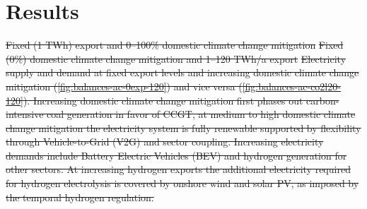 \documentclass[5p,numafflabel]{elsarticle}
\def\runstandard{decr_13_3H_ws} %
\providecommand{\DIFdeltex}[1]{{\protect\color{red}\sout{#1}}}                      %
\providecommand{\DIFdelbegin}{} %
\providecommand{\DIFdelFL}[1]{\DIFdel{#1}} %
\providecommand{\DIFdel}[1]{\texorpdfstring{\DIFdeltex{#1}}{}} %
\newcommand{\DIFscaledelfig}{0.5}
\newlength{\DIFdelgraphicswidth} %
\newlength{\DIFdelgraphicsheight} %
\newcommand{\DIFdelincludegraphics}[2][]{%
\sbox{\DIFdelgraphicsbox}{\DIFOincludegraphics[#1]{#2}}%
\settoboxwidth{\DIFdelgraphicswidth}{\DIFdelgraphicsbox} %
\settoboxtotalheight{\DIFdelgraphicsheight}{\DIFdelgraphicsbox} %
\scalebox{\DIFscaledelfig}{%
\parbox[b]{\DIFdelgraphicswidth}{\usebox{\DIFdelgraphicsbox}\\[-\baselineskip] \rule{\DIFdelgraphicswidth}{0em}}\llap{\resizebox{\DIFdelgraphicswidth}{\DIFdelgraphicsheight}{%
\setlength{\unitlength}{\DIFdelgraphicswidth}%
\begin{picture}(1,1)%
\thicklines\linethickness{2pt} %
{\color[rgb]{1,0,0}\put(0,0){\framebox(1,1){}}}%
{\color[rgb]{1,0,0}\put(0,0){\line( 1,1){1}}}%
{\color[rgb]{1,0,0}\put(0,1){\line(1,-1){1}}}%
\end{picture}%
}\hspace*{3pt}}} %
} %
\DeclareRobustCommand{\DIFdelbegin}{\DIFOdelbegin \let\includegraphics\DIFdelincludegraphics} %
\begin{document}
\section*{Results}
\label{sec:results}





\DIFdelbegin %
{%
\DIFdelFL{Fixed (1 TWh) export and 0--100\% domestic climate change mitigation}}
{%
\DIFdelFL{Fixed (0\%) domestic climate change mitigation and 1--120 TWh/a export}}
{%
\DIFdelFL{Electricity supply and demand at fixed export levels and increasing domestic climate change mitigation (\ref{fig:balances-ac-0exp-120}) and vice versa (\ref{fig:balances-ac-co2l20-120}). Increasing domestic climate change mitigation first phases out carbon-intensive coal generation in favor of CCGT, at medium to high domestic climate change mitigation the electricity system is fully renewable supported by flexibility through Vehicle-to-Grid (V2G) and sector coupling. Increasing electricity demands include Battery Electric Vehicles (BEV) and hydrogen generation for other sectors.
    At increasing hydrogen exports the additional electricity required for hydrogen electrolysis is covered by onshore wind and solar PV, as imposed by the temporal hydrogen regulation. 
    }}
\end{document}
